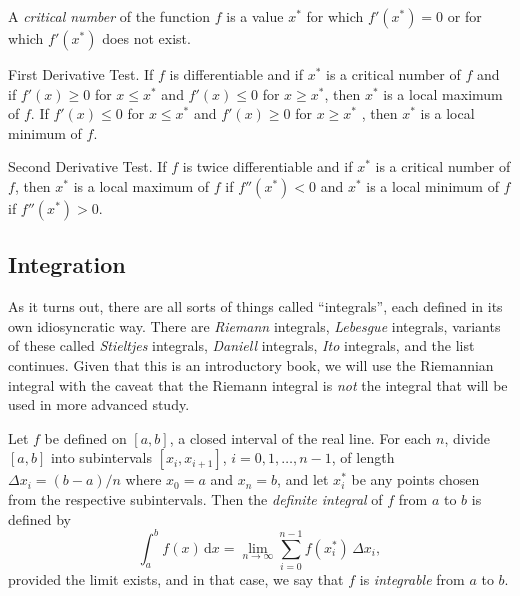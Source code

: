 \documentclass[captions=tableheading]{scrbook}
\begin{document}
\begin{defn}
A \emph{critical number} of the function \(f\) is a value \(x^{\ast}\) for which \(f'(x^{\ast})=0\) or for which \(f'(x^{\ast})\) does not exist.
\end{defn}

\begin{thm}
\label{thm:First-Derivative-Test}
First Derivative Test. If \(f\) is differentiable and if \(x^{\ast}\) is a critical number of \(f\) and if \(f'(x)\geq0\) for \(x\leq x^{\ast}\) and \(f'(x)\leq0\) for \(x\geq x^{\ast}\), then \(x^{\ast}\) is a local maximum of \(f\). If \(f'(x)\leq0\) for \(x\leq x^{\ast}\) and \(f'(x)\geq0\) for \(x\geq x^{\ast}\) , then \(x^{\ast}\) is a local minimum of \(f\).
\end{thm}

\begin{thm}
Second Derivative Test. If \(f\) is twice differentiable and if \(x^{\ast}\) is a critical number of \(f\), then \(x^{\ast}\) is a local maximum of \(f\) if \(f''(x^{\ast})<0\) and \(x^{\ast}\) is a local minimum of \(f\) if \(f''(x^{\ast})>0\).
\end{thm}
\subsection{Integration}
\label{sec-21-2-4}

As it turns out, there are all sorts of things called ``integrals'', each defined in its own idiosyncratic way. There are \emph{Riemann} integrals, \emph{Lebesgue} integrals, variants of these called \emph{Stieltjes} integrals, \emph{Daniell} integrals, \emph{Ito} integrals, and the list continues. Given that this is an introductory book, we will use the Riemannian integral with the caveat that the Riemann integral is \emph{not} the integral that will be used in more advanced study.

\begin{defn}
Let \(f\) be defined on \([a,b]\), a closed interval of the real line. For each \(n\), divide \([a,b]\) into subintervals \([x_{i},x_{i+1}]\), \(i=0,1,\ldots,n-1\), of length \(\Delta x_{i}=(b-a)/n\) where \(x_{0}=a\) and \(x_{n}=b\), and let \(x_{i}^{\ast}\) be any points chosen from the respective subintervals. Then the \emph{definite integral} of \(f\) from \(a\) to \(b\) is defined by
\begin{equation}
\int_{a}^{b}f(x)\,\mathrm{d} x=\lim_{n\to\infty}\sum_{i=0}^{n-1}f(x_{i}^{\ast})\,\Delta x_{i},
\end{equation}
provided the limit exists, and in that case, we say that \(f\) is \emph{integrable} from \(a\) to \(b\). 
\end{defn}
\end{document}
